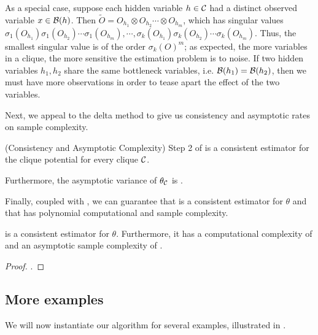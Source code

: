 As a special case, suppose each hidden variable $h \in \mathcal{C}$ had
  a distinct observed variable $x \in \mathcal{B}(h)$. 
Then $\tilde O = O_{h_1} \otimes O_{h_2} \cdots \otimes O_{h_m}$, which
  has singular values $\sigma_1(O_{h_1}) \sigma_1(O_{h_2}) \cdots
  \sigma_1(O_{h_m}), \cdots, \sigma_k(O_{h_1}) \sigma_k(O_{h_2}) \cdots
  \sigma_k(O_{h_m})$. 
Thus, the smallest singular value is of the order $\sigma_k(O)^m$; as
  expected, the more variables in a clique, the more sensitive the
  estimation problem is to noise.
If two hidden variables $h_1, h_2$ share the same bottleneck
  variables, i.e. $\mathcal{B}(h_1) = \mathcal{B}(h_2)$, then we must have more
  observations in order to tease apart the effect of the two
  variables\verify\reword.


Next, we appeal to the delta method to give us
  consistency and asymptotic rates on sample complexity.
\begin{corollary}(Consistency and Asymptotic Complexity)
  \label{cor:asymptotics}
  Step 2 of  is a consistent estimator for
  the clique potential for every clique $\mathcal{C}$.

  Furthermore, the asymptotic variance of $\theta_{\mathcal{C}}$ is
  .
\end{corollary}

Finally, coupled with , we can guarantee that
   is a consistent estimator for $\theta$ and 
  that has polynomial computational and sample complexity.
\begin{theorem}
   is a consistent estimator for $\theta$.
  Furthermore, it has a computational complexity of  and an
    asymptotic sample complexity of .
\end{theorem}
\begin{proof}
  .
\end{proof}

\subsection{More examples}

We will now instantiate our algorithm for several examples, illustrated in .

